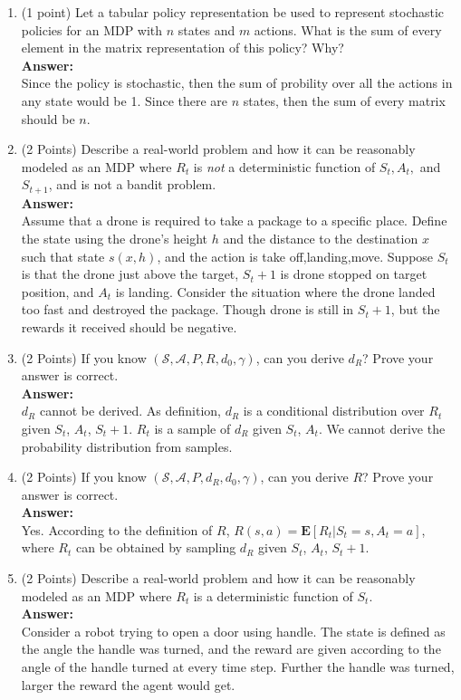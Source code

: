 \documentclass[]{article}
\begin{document}
\begin{enumerate}
    \item (1 point) Let a tabular policy representation be used to represent stochastic policies for an MDP with $n$ states and $m$ actions. What is the sum of every element in the matrix representation of this policy? Why?\\
    \textbf{Answer:}\\
    Since the policy is stochastic, then the sum of probility over all the actions in any state would be 1. Since there are $n$ states, then the sum of every matrix should be $n$.
   
    
    \item (2 Points) Describe a real-world problem and how it can be reasonably modeled as an MDP where $R_t$ is \emph{not} a deterministic function of $S_t, A_t,$ and $S_{t+1}$, and is not a bandit problem. \\
    \textbf{Answer:}\\
    Assume that a drone is required to take a package to a specific place. Define the state using the drone's height $h$ and the distance to the destination $x$ such that state $s(x,h)$, and the action is {take off,landing,move}. Suppose $S_t$ is that the drone just above the target, $S_t+1$ is drone stopped on target position, and $A_t$ is landing. Consider the situation where the drone landed too fast and destroyed the package. Though drone is still in $S_t+1$, but the rewards it received should be negative.
    
    
    \item (2 Points) If you know $(\mathcal S, \mathcal A, P, R, d_0, \gamma)$, can you derive $d_R$? Prove your answer is correct. \\
    \textbf{Answer:}\\
    $d_R$ cannot be derived. As definition, $d_R$ is a conditional distribution over $R_t$ given $S_t$, $A_t$, $S_t+1$. $R_t$ is a sample of $d_R$ given $S_t$, $A_t$. We cannot derive the probability distribution from samples.
    
    \item (2 Points) If you know $(\mathcal S, \mathcal A, P, d_R, d_0, \gamma)$, can you derive $R$? Prove your answer is correct. \\
    \textbf{Answer:}\\
    Yes. According to the definition of $R$, $R(s,a)=\mathbf{E}[R_t|S_t=s,A_t=a]$, where $R_t$ can be obtained by sampling $d_R$ given $S_t$, $A_t$, $S_t+1$.
    
    \item (2 Points) Describe a real-world problem and how it can be reasonably modeled as an MDP where $R_t$ is a deterministic function of $S_t$.\\
    \textbf{Answer:}\\
    Consider a robot trying to open a door using handle. The state is defined as the angle the handle was turned, and the reward are given according to the angle of the handle turned at every time step. Further the handle was turned, larger the reward the agent would get.


\end{enumerate}
\end{document}
